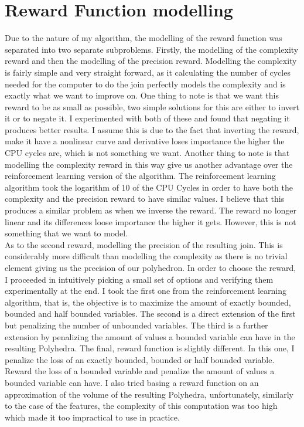 \section{Reward Function modelling}
Due to the nature of my algorithm, the modelling of the reward function was separated into two separate subproblems. Firstly, the modelling of the complexity reward and then the modelling of the precision reward. Modelling the complexity is fairly simple and very straight forward, as it calculating the number of cycles needed for the computer to do the join perfectly models the complexity and is exactly what we want to improve on. One thing to note is that we want this reward to be as small as possible, two simple solutions for this are either to invert it or to negate it. I experimented with both of these and found that negating it produces better results. I assume this is due to the fact that inverting the reward, make it have a nonlinear curve and derivative loses importance the higher the CPU cycles are, which is not something we want. Another thing to note is that modelling the complexity reward in this way give us another advantage over the reinforcement learning version of the algorithm. The reinforcement learning algorithm took the logarithm of 10 of the CPU Cycles in order to have both the complexity and the precision reward to have similar values. I believe that this produces a similar problem as when we inverse the reward. The reward no longer linear and its differences loose importance the higher it gets. However, this is not something that we want to model.\\
As to the second reward, modelling the precision of the resulting join. This is considerably more difficult than modelling the complexity as there is no trivial element giving us the precision of our polyhedron. In order to choose the reward, I proceeded in intuitively picking a small set of options and verifying them experimentally at the end. I took the first one from the reinforcement learning algorithm, that is, the objective is to maximize the amount of exactly bounded, bounded and half bounded variables. The second is a direct extension of the first but penalizing the number of unbounded variables. The third is a further extension by penalizing the amount of values a bounded variable can have in the resulting Polyhedra. The final, reward function is slightly different. In this one, I penalize the loss of an exactly bounded, bounded or half bounded variable. Reward the loss of a bounded variable and penalize the amount of values a bounded variable can have. I also tried basing a reward function on an approximation of the volume of the resulting Polyhedra, unfortunately, similarly to the case of the features, the complexity of this computation was too high which made it too impractical to use in practice.

